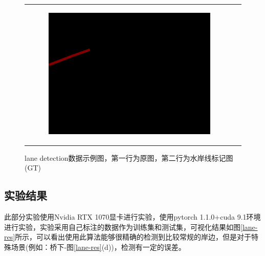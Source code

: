 \documentclass[cn,12pt,color=mine,scheme=chinese,bibstyle=gb7714-2015]{elegantbook}
\begin{document}
\begin{figure}[!htp]
\begin{tabular}{cc}
\begin{subfigure}[b]{0.23\linewidth}
			\centering\includegraphics[width=\linewidth]{lane/train4gt}\caption{\label{lane:d}}
		\end{subfigure}
	\end{tabular}
	\caption{lane detection数据示例图，第一行为原图，第二行为水岸线标记图(GT)}
	\label{lane}
\end{figure}

\subsection{实验结果}
此部分实验使用Nvidia RTX 1070显卡进行实验，使用pytorch 1.1.0+cuda 9.1环境进行实验，实验采用自己标注的数据作为训练集和测试集，可视化结果如图\ref{lane-res}所示，可以看出使用此算法能够很精确的检测到比较常规的岸边，但是对于特殊场景(例如：桥下-图\ref{lane-res}(d))，检测有一定的误差。
\end{document}
